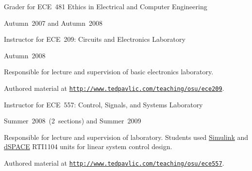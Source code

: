 \documentclass[10pt]{article}
\newcommand{\halfblankline}{\quad\vspace{-0.5\baselineskip}\pagebreak[3]}
\providecommand*\url[1]{\href{#1}{#1}}
\renewcommand*\url[1]{\href{#1}{\texttt{#1}}}
\begin{document}
\begin{outerlist}
\begin{innerlist}
        \halfblankline

        \item Grader for ECE~481 Ethics in Electrical and Computer Engineering
        \begin{innerlist}
            \item Autumn~2007 and Autumn~2008
        \end{innerlist}

        \halfblankline

        \item Instructor for ECE~209: Circuits and Electronics
            Laboratory
        \begin{innerlist}
            \item Autumn~2008


            \item Responsible for lecture and supervision of basic
                electronics laboratory.

            \item Authored material at
                \url{http://www.tedpavlic.com/teaching/osu/ece209}.
        \end{innerlist}

        \halfblankline

        \item Instructor for ECE~557: Control, Signals, and Systems
            Laboratory
        \begin{innerlist}
            \item Summer~2008~(2~sections) and Summer~2009


            \item Responsible for lecture and supervision of laboratory.
                Students used
                \href{http://www.mathworks.com/products/simulink/}{Simulink}
                and \href{http://www.dspaceinc.com/}{dSPACE} RTI1104
                units for linear system control design.

            \item Authored material at
                \url{http://www.tedpavlic.com/teaching/osu/ece557}.
        \end{innerlist}

        \halfblankline


\end{innerlist}
\end{outerlist}
\end{document}
